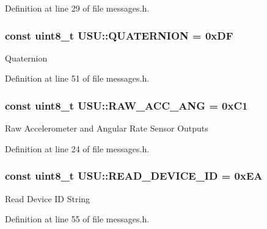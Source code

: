 \-Definition at line 29 of file messages.\-h.

\hypertarget{namespace_u_s_u_ad476e2e7f70dbe869e508f676bea92a9}{
\subsubsection[{\-Q\-U\-A\-T\-E\-R\-N\-I\-O\-N}]{\setlength{\rightskip}{0pt plus 5cm}const uint8\-\_\-t {\bf \-U\-S\-U\-::\-Q\-U\-A\-T\-E\-R\-N\-I\-O\-N} = 0x\-D\-F}}\label{namespace_u_s_u_ad476e2e7f70dbe869e508f676bea92a9}
\-Quaternion 

\-Definition at line 51 of file messages.\-h.

\hypertarget{namespace_u_s_u_a6bbb473161195a7e10d9f821cece1b04}{
\subsubsection[{\-R\-A\-W\-\_\-\-A\-C\-C\-\_\-\-A\-N\-G}]{\setlength{\rightskip}{0pt plus 5cm}const uint8\-\_\-t {\bf \-U\-S\-U\-::\-R\-A\-W\-\_\-\-A\-C\-C\-\_\-\-A\-N\-G} = 0x\-C1}}\label{namespace_u_s_u_a6bbb473161195a7e10d9f821cece1b04}
\-Raw \-Accelerometer and \-Angular \-Rate \-Sensor \-Outputs 

\-Definition at line 24 of file messages.\-h.

\hypertarget{namespace_u_s_u_ad810b0281ab629302e9fd716374b90ed}{
\subsubsection[{\-R\-E\-A\-D\-\_\-\-D\-E\-V\-I\-C\-E\-\_\-\-I\-D}]{\setlength{\rightskip}{0pt plus 5cm}const uint8\-\_\-t {\bf \-U\-S\-U\-::\-R\-E\-A\-D\-\_\-\-D\-E\-V\-I\-C\-E\-\_\-\-I\-D} = 0x\-E\-A}}\label{namespace_u_s_u_ad810b0281ab629302e9fd716374b90ed}
\-Read \-Device \-I\-D \-String 

\-Definition at line 55 of file messages.\-h.

